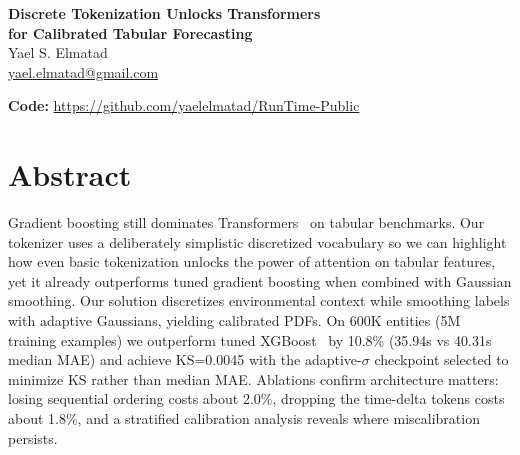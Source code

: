 \documentclass{article}
\begin{document}
\begin{center}
 {\LARGE \bf Discrete Tokenization Unlocks Transformers\\[0.4em]for Calibrated Tabular Forecasting}\\[1em]
  {\large Yael S. Elmatad}\\[0.3em]
  {\small \href{mailto:yael.elmatad@gmail.com}{yael.elmatad@gmail.com}}
\end{center}
\vspace{-0.5em}
\noindent\textbf{Code:} \url{https://github.com/yaelelmatad/RunTime-Public}
\section*{Abstract}
Gradient boosting still dominates Transformers~\cite{vaswani2017attention} on tabular benchmarks. Our tokenizer uses a deliberately simplistic discretized vocabulary so we can highlight how even basic tokenization unlocks the power of attention on tabular features, yet it already outperforms tuned gradient boosting when combined with Gaussian smoothing. Our solution discretizes environmental context while smoothing labels with adaptive Gaussians, yielding calibrated PDFs. On 600K entities (5M training examples) we outperform tuned XGBoost~\cite{chen2016xgboost} by 10.8\% (35.94s vs 40.31s median MAE) and achieve KS=0.0045 with the adaptive-\(\sigma\) checkpoint selected to minimize KS rather than median MAE. Ablations confirm architecture matters: losing sequential ordering costs about 2.0\%, dropping the time-delta tokens costs about 1.8\%, and a stratified calibration analysis reveals where miscalibration persists.
\end{document}
